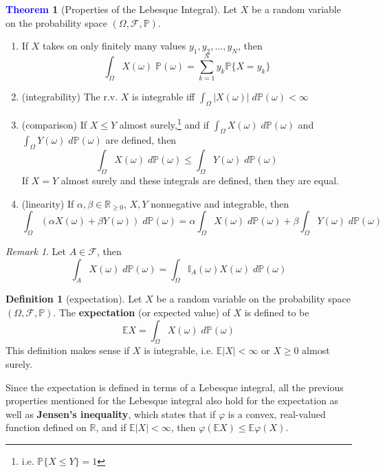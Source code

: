 \documentclass[11pt]{article}
\theoremstyle{definition}
\theoremstyle{definition}
\newcommand{\R}[0]{\mathbb{R}}
\newtheorem{theorem}{\textcolor{blue}{Theorem}}
\theoremstyle{definition}
\newtheorem{definition}{\textcolor{OliveGreen}{Definition}}
\theoremstyle{remark}
\newtheorem*{remark}{Remark}
\begin{document}
\begin{theorem}[Properties of the Lebesque Integral]
    Let $X$ be a random variable on the probability space $(\Omega, \mathcal{F}, \mathbb{P})$.  
    \begin{enumerate}
        \item If $X$ takes on only finitely many values $y_1, y_2, \dots, y_N$, then 
        \[
            \int_{\Omega} X(\omega) \; \mathbb{P}(\omega) = \sum_{k = 1}^N y_k \mathbb{P}\{X = y_k\}
        \]   
        \item (integrability) The r.v. $X$ is integrable iff $\int_{\Omega} | X(\omega) | \; d\mathbb{P}(\omega) < \infty$
        \item (comparison) If $X \leq Y$ almost surely,\footnote{i.e. $\mathbb{P}\{X \leq Y\} = 1$} and if
        $\int_{\Omega} X(\omega) \; d\mathbb{P}(\omega)$ and $\int_{\Omega} Y(\omega) \; d\mathbb{P}(\omega)$
        are defined, then
        \[
            \int_{\Omega} X(\omega) \; d\mathbb{P}(\omega) \leq \int_{\Omega} Y(\omega) \; d\mathbb{P}(\omega)
        \] 
        If $X = Y$ almost surely and these integrals are defined, then they are equal. 
        \item (linearity) If $\alpha, \beta \in \R_{\geq 0}$, $X, Y$ nonnegative and integrable, then
        \[
            \int_{\Omega} (\alpha X(\omega) + \beta Y(\omega)) \; d\mathbb{P}(\omega) = 
            \alpha \int_{\Omega} X(\omega) \; d\mathbb{P}(\omega) + \beta \int_{\Omega} Y(\omega) \; d\mathbb{P}(\omega)
        \]  
    \end{enumerate}
\end{theorem}

\begin{remark}
    Let $A \in \mathcal{F}$, then
    \[
        \int_A X(\omega) \; d\mathbb{P}(\omega) = \int_{\Omega} \mathbb{I}_A(\omega) X(\omega )\; d\mathbb{P}(\omega)
    \]  
\end{remark}

\begin{definition}[expectation]
    Let $X$ be a random variable on the probability space $(\Omega, \mathcal{F}, \mathbb{P})$. The 
    \textbf{expectation} (or expected value) of $X$ is defined to be
    \[
        \mathbb{E}X = \int_{\Omega} X(\omega) \; d\mathbb{P}(\omega)
    \]  
    This definition makes sense if $X$ is integrable, i.e. $\mathbb{E} |X| < \infty$ or $X \geq 0$ almost surely.  
\end{definition}

Since the expectation is defined in terms of a Lebesque integral, all the previous properties mentioned for the Lebesque
integral also hold for the expectation as well as \textbf{Jensen's inequality}, which states that if
$\varphi$ is a convex, real-valued function defined on $\R$, and if $\mathbb{E} |X| < \infty$, then
$\varphi(\mathbb{E} X) \leq \mathbb{E} \varphi(X)$.
\end{document}
